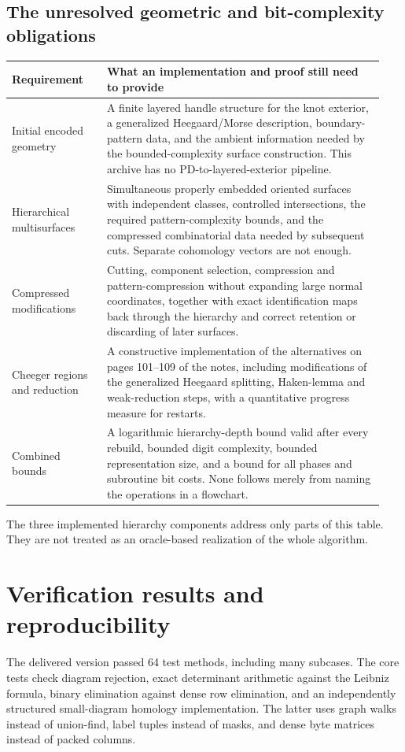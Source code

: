 \documentclass[11pt]{article}
\theoremstyle{remark}\newtheorem{remark}[theorem]{Remark}
\newcommand{\code}[1]{\texttt{\detokenize{#1}}}
\begin{document}
\subsection{The unresolved geometric and bit-complexity obligations}
\begin{longtable}{@{}p{0.24\linewidth}p{0.70\linewidth}@{}}
\toprule
Requirement & What an implementation and proof still need to provide\\
\midrule
\endhead
Initial encoded geometry &
A finite layered handle structure for the knot exterior, a generalized
Heegaard/Morse description, boundary-pattern data, and the ambient information
needed by the bounded-complexity surface construction. This archive has no
PD-to-layered-exterior pipeline.\\[4pt]
Hierarchical multisurfaces &
Simultaneous properly embedded oriented surfaces with independent classes,
controlled intersections, the required pattern-complexity bounds, and the
compressed combinatorial data needed by subsequent cuts. Separate cohomology
vectors are not enough.\\[4pt]
Compressed modifications &
Cutting, component selection, compression and pattern-compression without
expanding large normal coordinates, together with exact identification maps
back through the hierarchy and correct retention or discarding of later
surfaces.\\[4pt]
Cheeger regions and reduction &
A constructive implementation of the alternatives on pages 101--109 of the
notes, including modifications of the generalized Heegaard splitting,
Haken-lemma and weak-reduction steps, with a quantitative progress measure
for restarts.\\[4pt]
Combined bounds &
A logarithmic hierarchy-depth bound valid after every rebuild, bounded digit
complexity, bounded representation size, and a bound for all phases and
subroutine bit costs. None follows merely from naming the operations in a
flowchart.\\
\bottomrule
\end{longtable}
The three implemented hierarchy components address only parts of this table.
They are not treated as an oracle-based realization of the whole algorithm.

\section{Verification results and reproducibility}
The delivered version passed 64 \code{unittest} test methods, including many
subcases. The core tests check diagram rejection, exact determinant arithmetic
against the Leibniz formula, binary elimination against dense row elimination,
and an independently structured small-diagram homology implementation. The
latter uses graph walks instead of union-find, label tuples instead of masks,
and dense byte matrices instead of packed columns.
\end{document}
